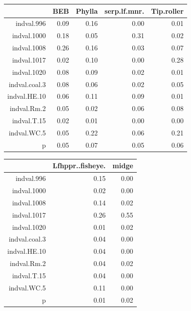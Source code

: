 \documentclass[12pt]{article}
\begin{document}
\begin{table}[ht]
\begin{center}
\begin{tabular}{rrrrr}
  \hline
 & BEB & Phylla & serp.lf.mnr. & Tip.roller \\ 
  \hline
indval.996 & 0.09 & 0.16 & 0.00 & 0.01 \\ 
  indval.1000 & 0.18 & 0.05 & 0.31 & 0.02 \\ 
  indval.1008 & 0.26 & 0.16 & 0.03 & 0.07 \\ 
  indval.1017 & 0.02 & 0.10 & 0.00 & 0.28 \\ 
  indval.1020 & 0.08 & 0.09 & 0.02 & 0.01 \\ 
  indval.coal.3 & 0.08 & 0.06 & 0.02 & 0.05 \\ 
  indval.HE.10 & 0.06 & 0.11 & 0.09 & 0.01 \\ 
  indval.Rm.2 & 0.05 & 0.02 & 0.06 & 0.08 \\ 
  indval.T.15 & 0.02 & 0.01 & 0.00 & 0.00 \\ 
  indval.WC.5 & 0.05 & 0.22 & 0.06 & 0.21 \\ 
  p & 0.05 & 0.07 & 0.05 & 0.06 \\ 
   \hline
\end{tabular}
\end{center}
\end{table}%
\begin{table}[ht]
\begin{center}
\begin{tabular}{rrr}
  \hline
 & Lfhppr..fisheye. & midge \\ 
  \hline
indval.996 & 0.15 & 0.00 \\ 
  indval.1000 & 0.02 & 0.00 \\ 
  indval.1008 & 0.14 & 0.02 \\ 
  indval.1017 & 0.26 & 0.55 \\ 
  indval.1020 & 0.01 & 0.02 \\ 
  indval.coal.3 & 0.04 & 0.00 \\ 
  indval.HE.10 & 0.04 & 0.00 \\ 
  indval.Rm.2 & 0.04 & 0.02 \\ 
  indval.T.15 & 0.04 & 0.00 \\ 
  indval.WC.5 & 0.11 & 0.00 \\ 
  p & 0.01 & 0.02 \\ 
   \hline
\end{tabular}
\end{center}
\end{table}
\end{document}
